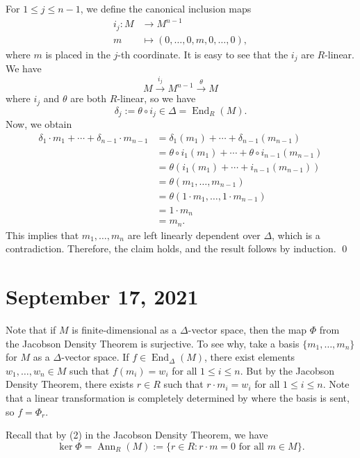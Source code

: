 \documentclass[10pt]{article}
\numberwithin{equation}{section}
\DeclareMathOperator{\End}{End}
\DeclareMathOperator{\Ann}{Ann}
\theoremstyle{newstyle}
\begin{document}
\begin{enumerate}[(1)]
    For $1 \leq j \leq n-1$, we define the canonical inclusion maps 
    \begin{align*}
        i_j : M &\to M^{n-1} \\
        m &\mapsto (0, \dots, 0, m, 0, \dots, 0),
    \end{align*}
    where $m$ is placed in the $j$-th coordinate. It is easy to see that the $i_j$ are $R$-linear. 
    We have 
    \[ M \xrightarrow{i_j} M^{n-1} \xrightarrow{\theta} M \]
    where $i_j$ and $\theta$ are both $R$-linear, so we have 
    \[ \delta_j := \theta \circ i_j \in \Delta = \End_R(M). \]
    Now, we obtain 
    \begin{align*}
        \delta_1 \cdot m_1 + \cdots + \delta_{n-1} \cdot m_{n-1} 
        &= \delta_1(m_1) + \cdots + \delta_{n-1}(m_{n-1}) \\
        &= \theta \circ i_1(m_1) + \cdots + \theta \circ i_{n-1}(m_{n-1}) \\
        &= \theta(i_1(m_1) + \cdots + i_{n-1}(m_{n-1})) \\
        &= \theta(m_1, \dots, m_{n-1}) \\
        &= \theta(1 \cdot m_1, \dots, 1 \cdot m_{n-1}) \\
        &= 1 \cdot m_n \\
        &= m_n.
    \end{align*}
    This implies that $m_1, \dots, m_n$ are left linearly dependent over $\Delta$, which is a contradiction.
    Therefore, the claim holds, 
    and the result follows by induction. \qed
    
\end{enumerate}

\section{September 17, 2021}

Note that if $M$ is finite-dimensional as a $\Delta$-vector space, then the map $\Phi$ from the 
Jacobson Density Theorem is surjective. To see why, take a basis $\{m_1, \dots, m_n\}$ for $M$ as a 
$\Delta$-vector space. If $f \in \End_\Delta(M)$, there exist elements $w_1, \dots, w_n \in M$ 
such that $f(m_i) = w_i$ for all $1 \leq i \leq n$. But by the Jacobson Density Theorem, there
exists $r \in R$ such that $r \cdot m_i = w_i$ for all $1 \leq i \leq n$. 
Note that a linear transformation is completely 
determined by where the basis is sent, so $f = \Phi_r$. 

Recall that by (2) in the Jacobson Density Theorem, we have 
\[ \ker \Phi = \Ann_R(M) := \{r \in R : r \cdot m = 0 \text{ for all } m \in M\}. \]
\end{document}
